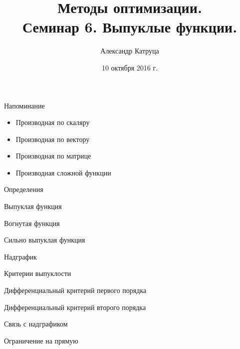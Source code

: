 \documentclass[12pt,russian]{beamer}
\title[Семинар 6]{Методы оптимизации. \\
 Семинар 6. Выпуклые функции.}
\author{Александр Катруца}
\institute{Московский физико-технический институт,\\
Факультет Управления и Прикладной Математики}
\date{10 октября 2016 г.}
\begin{document}
\begin{frame}
\maketitle
\end{frame}

\begin{frame}{Напоминание}
\begin{itemize}
\item Производная по скаляру
\item Производная по вектору
\item Производная по матрице
\item Производная сложной функции
\end{itemize}
\end{frame}

\begin{frame}{Определения}
\begin{block}{Выпуклая функция}

\end{block}

\begin{block}{Вогнутая функция}

\end{block}

\begin{block}{Сильно выпуклая функция}

\end{block}

\begin{block}{Надграфик}

\end{block}

\end{frame}

\begin{frame}{Критерии выпуклости}
\begin{block}{Дифференциальный критерий первого порядка}

\end{block}

\begin{block}{Дифференциальный критерий второго порядка}

\end{block}

\begin{block}{Связь с надграфиком}

\end{block}

\begin{block}{Ограничение на прямую}

\end{block}
\end{frame}
\end{document}
